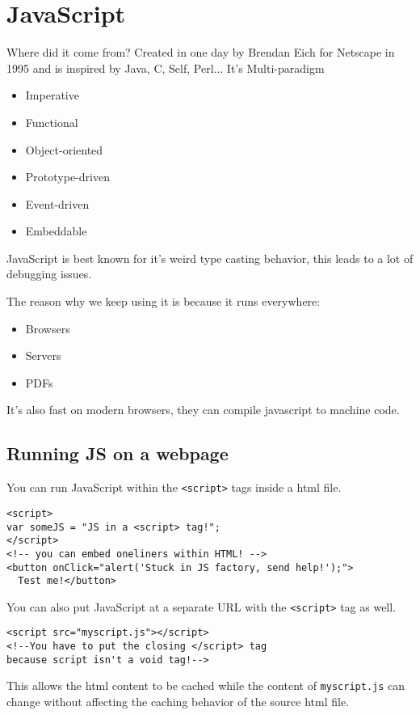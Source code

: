 \documentclass[../CMPUT-404-Notes.tex]{subfiles}
\begin{document}
\chapter{JavaScript}
Where did it come from?
Created in one day by Brendan Eich for Netscape in 1995 and is inspired by Java, C, Self, Perl...
It's Multi-paradigm

\begin{itemize}
    \item Imperative
    \item Functional
    \item Object-oriented
    \item Prototype-driven
    \item Event-driven
    \item Embeddable
\end{itemize}

JavaScript is best known for it's weird type casting behavior, this leads to a lot of debugging issues.

The reason why we keep using it is because it runs everywhere: 
\begin{itemize}
    \item Browsers
    \item Servers 
    \item PDFs  
\end{itemize}

It's also fast on modern browsers, they can compile javascript to machine code.

\section{Running JS on a webpage}
You can run JavaScript within the \texttt{<script>} tags inside a html file.
\begin{verbatim}
<script>
var someJS = "JS in a <script> tag!";
</script>
<!-- you can embed oneliners within HTML! -->
<button onClick="alert('Stuck in JS factory, send help!');">
  Test me!</button>
\end{verbatim}

You can also put JavaScript at a separate URL with the \texttt{<script>} tag as well.
\begin{verbatim}
<script src="myscript.js"></script>
<!--You have to put the closing </script> tag 
because script isn't a void tag!-->
\end{verbatim}
This allows the html content to be cached while the content of \texttt{myscript.js} can change without affecting the caching behavior of the source html file.
\end{document}
